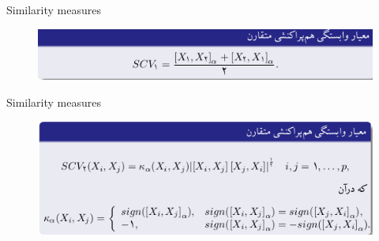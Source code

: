 \documentclass[ignorenonframetext,]{beamer}
\begin{document}
\begin{frame}{Similarity measures}

\begin{figure}
\centering
\includegraphics{pics/08-3.png}
\caption{}
\end{figure}

\end{frame}

\begin{frame}{Similarity measures}

\begin{figure}
\centering
\includegraphics{pics/08-4.png}
\caption{}
\end{figure}

\end{frame}
\end{document}
